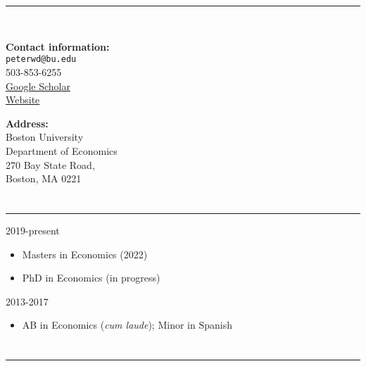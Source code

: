 \documentclass[12pt]{article}
\newenvironment{customitemize}
{ \begin{itemize}[leftmargin=\parindent, topsep = 1pt, itemsep = -1pt] }
{\end{itemize} }
\begin{document}
\normalsize
\singlespacing



\section*{\centering {}} 
\begin{center}
\rule{3in}{1pt} \\
\vspace*{0.1in}

\begin{minipage}[t]{3in}
\textbf{Contact information:} \\
\texttt{peterwd@bu.edu} \\
503-853-6255 \\
\href{https://scholar.google.com/citations?user=zMlunv0AAAAJ&hl=en}{Google Scholar} \\
\href{pdeffebach.github.io}{Website} \\
\end{minipage}
\hfill
\begin{minipage}[t]{2.0in}
\textbf{Address:}\\
Boston University \\
Department of Economics \\
270 Bay State Road, \\
Boston, MA 0221
\end{minipage}

\end{center} 

\section*{}
\noindent \rule{\textwidth}{1pt} 
  \hfill 2019-present 
\begin{customitemize}
	\item Masters in Economics (2022)
	\item PhD in Economics (in progress)
\end{customitemize}
  \hfill 2013-2017 
\begin{customitemize}
	\item AB in Economics (\emph{cum laude}); Minor in Spanish
\end{customitemize}

\section*{}
\noindent \rule{\textwidth}{1pt} 
\end{document}
